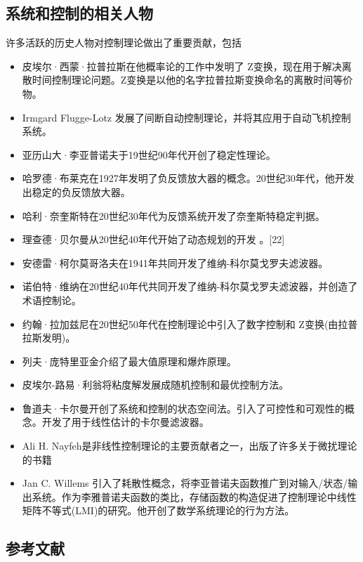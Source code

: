 \subsection{系统和控制的相关人物}

许多活跃的历史人物对控制理论做出了重要贡献，包括

\begin{itemize}
\item 皮埃尔·西蒙·拉普拉斯在他概率论的工作中发明了 Z变换，现在用于解决离散时间控制理论问题。Z变换是以他的名字拉普拉斯变换命名的离散时间等价物。
\item Irmgard Flugge-Lotz 发展了间断自动控制理论，并将其应用于自动飞机控制系统。
\item 亚历山大·李亚普诺夫于19世纪90年代开创了稳定性理论。
\item 哈罗德·布莱克在1927年发明了负反馈放大器的概念。20世纪30年代，他开发出稳定的负反馈放大器。
\item 哈利·奈奎斯特在20世纪30年代为反馈系统开发了奈奎斯特稳定判据。
\item 理查德·贝尔曼从20世纪40年代开始了动态规划的开发 。[22]
\item 安德雷·柯尔莫哥洛夫在1941年共同开发了维纳-科尔莫戈罗夫滤波器。
\item 诺伯特·维纳在20世纪40年代共同开发了维纳-科尔莫戈罗夫滤波器，并创造了术语控制论。
\item 约翰·拉加兹尼在20世纪50年代在控制理论中引入了数字控制和 Z变换(由拉普拉斯发明)。
\item 列夫·庞特里亚金介绍了最大值原理和爆炸原理。
\item 皮埃尔-路易·利翁将粘度解发展成随机控制和最优控制方法。
\item 鲁道夫·卡尔曼开创了系统和控制的状态空间法。引入了可控性和可观性的概念。开发了用于线性估计的卡尔曼滤波器。
\item Ali H. Nayfeh是非线性控制理论的主要贡献者之一，出版了许多关于微扰理论的书籍
\item Jan C. Willems 引入了耗散性概念，将李亚普诺夫函数推广到对输入/状态/输出系统。作为李雅普诺夫函数的类比，存储函数的构造促进了控制理论中线性矩阵不等式(LMI)的研究。他开创了数学系统理论的行为方法。
\end{itemize}


\subsection{参考文献}

